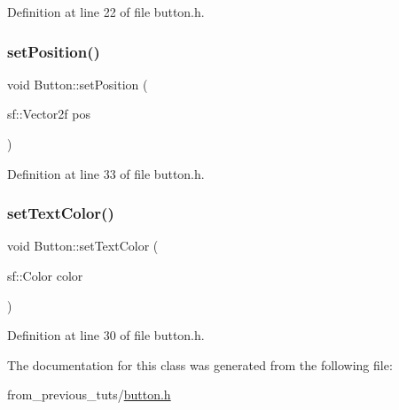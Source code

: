 Definition at line 22 of file button.\+h.

\mbox{\label{class_button_a93438906f229fb6e2ba63103140dbd9f}} 
\subsubsection{\texorpdfstring{set\+Position()}{setPosition()}}
{\footnotesize\ttfamily void Button\+::set\+Position (\begin{DoxyParamCaption}\item[{sf\+::\+Vector2f}]{pos }\end{DoxyParamCaption})\hspace{0.3cm}{\ttfamily [inline]}}



Definition at line 33 of file button.\+h.

\mbox{\label{class_button_a0cb69f44122ef0923e6a3ea1a198257a}} 
\subsubsection{\texorpdfstring{set\+Text\+Color()}{setTextColor()}}
{\footnotesize\ttfamily void Button\+::set\+Text\+Color (\begin{DoxyParamCaption}\item[{sf\+::\+Color}]{color }\end{DoxyParamCaption})\hspace{0.3cm}{\ttfamily [inline]}}



Definition at line 30 of file button.\+h.



The documentation for this class was generated from the following file\+:\begin{DoxyCompactItemize}
\item 
from\+\_\+previous\+\_\+tuts/\mbox{\hyperlink{button_8h}{button.\+h}}\end{DoxyCompactItemize}
